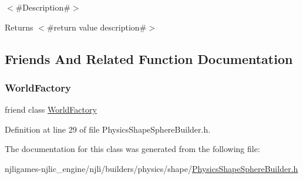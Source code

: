 $<$\#\+Description\#$>$

\begin{DoxyReturn}{Returns}
$<$\#return value description\#$>$ 
\end{DoxyReturn}


\subsection{Friends And Related Function Documentation}
\mbox{\label{classnjli_1_1_physics_shape_sphere_builder_acb96ebb09abe8f2a37a915a842babfac}} 
\subsubsection{\texorpdfstring{World\+Factory}{WorldFactory}}
{\footnotesize\ttfamily friend class \mbox{\hyperlink{classnjli_1_1_world_factory}{World\+Factory}}\hspace{0.3cm}{\ttfamily [friend]}}



Definition at line 29 of file Physics\+Shape\+Sphere\+Builder.\+h.



The documentation for this class was generated from the following file\+:\begin{DoxyCompactItemize}
\item 
njligames-\/njlic\+\_\+engine/njli/builders/physics/shape/\mbox{\hyperlink{_physics_shape_sphere_builder_8h}{Physics\+Shape\+Sphere\+Builder.\+h}}\end{DoxyCompactItemize}
